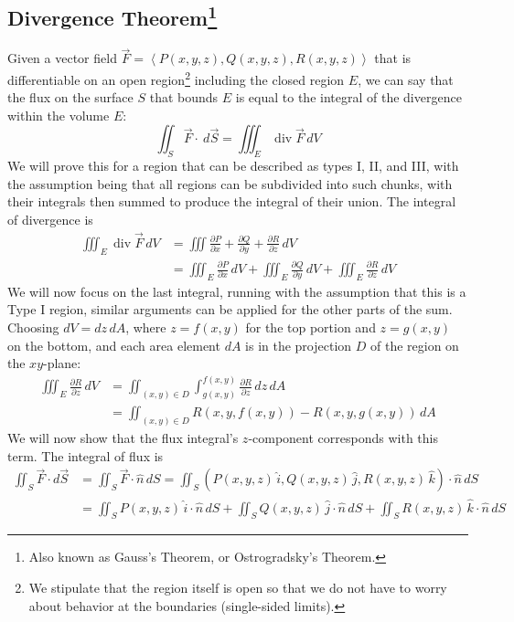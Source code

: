 \documentclass{article}
\DeclareMathOperator{\divergence}{div}
\newcommand{\vect}[1]{\ensuremath{\overrightarrow{#1}}}
\begin{document}
\subsection[Divergence Theorem]{Divergence Theorem\footnote{Also known as Gauss's Theorem, or Ostrogradsky's Theorem.}}
Given a vector field $\vect{F}=\left\langle P(x,y,z), Q(x,y,z), R(x,y,z) \right\rangle$ that is differentiable on an open region\footnote{We stipulate that the region itself is open so that we do not have to worry about behavior at the boundaries (single-sided limits).} including the closed region $E$, we can say that the flux on the surface $S$ that bounds $E$ is equal to the integral of the divergence within the volume $E$:
$$\iint_S\vect{F}\cdot\ d\vect{S}=\iiint_E\divergence{\vect{F}}\,dV$$
We will prove this for a region that can be described as types I, II, and III, with the assumption being that all regions can be subdivided into such chunks, with their integrals then summed to produce the integral of their union. The integral of divergence is
\begin{align*}
    \iiint_E\divergence{\vect{F}}\,dV&=\iiint\frac{\partial P}{\partial x} + \frac{\partial Q}{\partial y} + \frac{\partial R}{\partial z}\,dV \\
    &= \iiint_E\frac{\partial P}{\partial x}\,dV + \iiint_E\frac{\partial Q}{\partial y}\,dV + \iiint_E\frac{\partial R}{\partial z}\,dV
\end{align*}
We will now focus on the last integral, running with the assumption that this is a Type I region, similar arguments can be applied for the other parts of the sum. Choosing $dV=dz\,dA$, where $z=f(x,y)$ for the top portion and $z=g(x,y)$ on the bottom, and each area element $dA$ is in the projection $D$ of the region on the $xy$-plane:
\begin{align*}
    \iiint_E\frac{\partial R}{\partial z}\,dV &= \iint_{(x,y)\in D}\int^{f(x,y)}_{g(x,y)}\frac{\partial R}{\partial z}\,dz\,dA\\
    &=\iint_{(x,y)\in D}R(x,y,f(x,y))-R(x,y,g(x,y))\,dA
\end{align*}
We will now show that the flux integral's $z$-component corresponds with this term. The integral of flux is
\begin{align*}
    \iint_S\vect{F}\cdot d\vect{S}&=\iint_S\vect{F}\cdot \hat{n}\,dS=\iint_S\left(P(x,y,z)\,\hat{i},Q(x,y,z)\,\hat{j}, R(x,y,z)\,\hat{k}\right)\cdot\hat{n}\,dS\\
    &=\iint_S P(x,y,z)\,\hat{i}\cdot\hat{n}\,dS + \iint_S Q(x,y,z)\,\hat{j}\cdot\hat{n}\,dS  + \iint_S R(x,y,z)\,\hat{k}\cdot\hat{n}\,dS
\end{align*}
\end{document}
